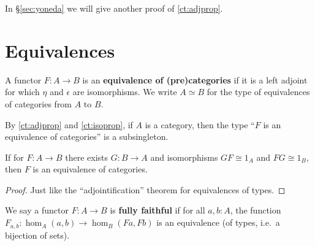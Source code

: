 In \S\ref{sec:yoneda} we will give another proof of \autoref{ct:adjprop}.


\section{Equivalences}
\label{sec:equivalences}

\begin{defn}
  A functor $F:A\to B$ is an \textbf{equivalence of (pre)categories} if it is a left adjoint for which $\eta$ and $\epsilon$ are isomorphisms.
  We write $A\simeq B$ for the type of equivalences of categories from $A$ to $B$.
\end{defn}

By \autoref{ct:adjprop} and \autoref{ct:isoprop}, if $A$ is a category, then the type ``$F$ is an equivalence of categories'' is a subsingleton.

\begin{lem}\label{ct:adjointification}
  If for $F:A\to B$ there exists $G:B\to A$ and isomorphisms $GF\cong 1_A$ and $FG\cong 1_B$, then $F$ is an equivalence of categories.
\end{lem}
\begin{proof}
  Just like the ``adjointification'' theorem for equivalences of types.
\end{proof}

We say a functor $F:A\to B$ is \textbf{fully faithful} if for all $a,b:A$, the function $F_{a,b}:\hom_A(a,b) \to \hom_B(Fa,Fb)$ is an equivalence (of types, i.e.\ a bijection of sets).

